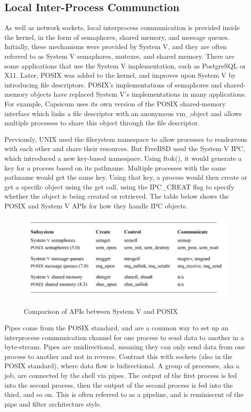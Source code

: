 \documentclass[12pt, dvipsnames, a4paper]{article}
\begin{document}
\subsection{Local Inter-Process Communction}
As well as network sockets, local interprocess communication is provided inside the kernel, in the form of semaphores, shared memory, and message queues. Initially, these mechanisms were provided by System V, and they are often referred to as System V semaphores, mutexes, and shared memory. There are some applications that use the System V implementation, such as PostgreSQL or X11. Later, POSIX was added to the kernel, and improves upon System V by introducing file descriptors. POSIX’s implementations of semaphores and shared-memory objects have replaced System V’s implementations in many applications. For example, Capsicum uses its own version of the POSIX shared-memory interface which links a file descriptor with an anonymous vm\_object and allows multiple processes to share this object through the file descriptor.

Previously, UNIX used the filesystem namespace to allow processes to rendezvous with each other and share their resources. But FreeBSD used the System V IPC, which introduced a new key-based namespace. Using ftok(), it would generate a key for a process based on its pathname. Multiple processes with the same pathname would get the same key. Using that key, a process would then create or get a specific object using the get call, using the IPC\_CREAT flag to specify whether the object is being created or retrieved. The table below shows the POSIX and System V APIs for how they handle IPC objects.

\newpage
\begin{figure}[hbt!]
	\centering
	\includegraphics[width=570pt]{assets/localipc1.png}
	\caption{Comparison of APIs between System V and POSIX} \cite{mckusick}
\end{figure}

Pipes come from the POSIX standard, and are a common way to set up an interprocess communication channel for one process to send data to another in a byte-stream. Pipes are unidirectional, meaning they can only send data from one process to another and not in reverse. Contrast this with sockets (also in the POSIX standard), where data flow is bidirectional. A group of processes, aka a job, are connected by the shell via pipes. The output of the first process is fed into the second process, then the output of the second process is fed into the third, and so on. This is often referred to as a pipeline, and is reminiscent of the pipe and filter architecture style.
\end{document}
